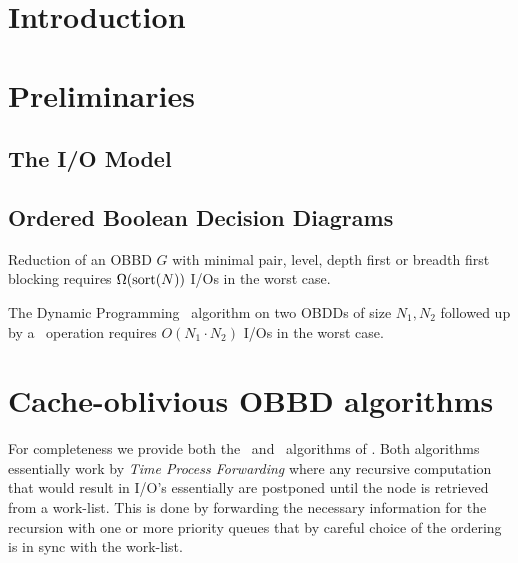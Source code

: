 \section{Introduction} \label{sec:intro}

\section{Preliminaries} \label{sec:preliminaries}

\subsection{The I/O Model}

\subsection{Ordered Boolean Decision Diagrams}

\begin{theorem} \label{thm:reduce_io_lower_bound}

  Reduction of an OBBD $G$ with minimal pair, level, depth first or breadth
  first blocking requires $\Omega(\text{sort}(N))$ I/Os in the worst case.
\end{theorem}

\begin{theorem} \label{thm:apply_io_worst_case}

  The Dynamic Programming \Apply\ algorithm on two OBDDs of size $N_1, N_2$
  followed up by a \Reduce\ operation requires $O(N_1 \cdot N_2)$ I/Os in the
  worst case.
\end{theorem}


\newpage
\section{Cache-oblivious OBBD algorithms} \label{sec:theory}

For completeness we provide both the \Reduce\ and \Apply\ algorithms of
\cite{Arge96}. Both algorithms essentially work by \emph{Time Process
  Forwarding} where any recursive computation that would result in I/O's
essentially are postponed until the node is retrieved from a work-list. This is
done by forwarding the necessary information for the recursion with one or more
priority queues that by careful choice of the ordering is in sync with the
work-list. 

